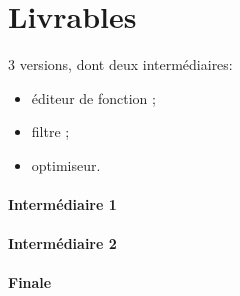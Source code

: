 \section{Livrables}
	\label{sec:livrables}

	3 versions, dont deux intermédiaires:
	\begin{itemize}
		\item éditeur de fonction ; 
		\item filtre ; 
		\item optimiseur.
	\end{itemize}

	\paragraph{Intermédiaire 1}

	\paragraph{Intermédiaire 2}

	\paragraph{Finale}